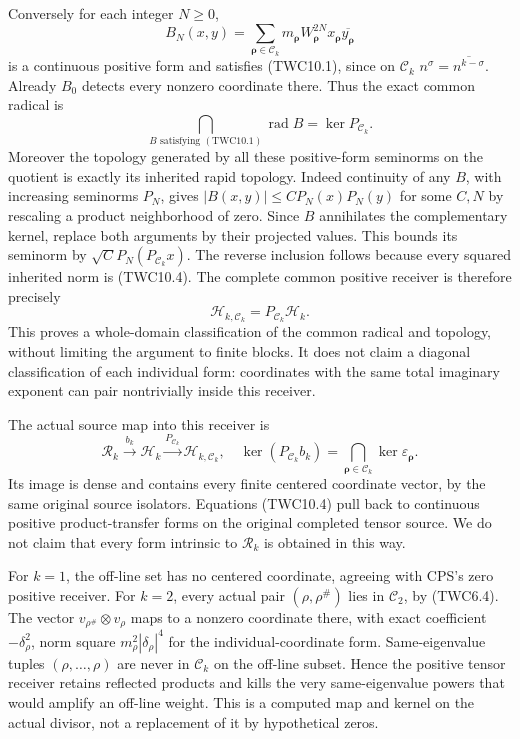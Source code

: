 Conversely for each integer \(N\ge0\), \[
B_N(x,y)=\sum_{\boldsymbol\rho\in\mathscr C_k}
m_{\boldsymbol\rho}W_{\boldsymbol\rho}^{2N}
 x_{\boldsymbol\rho}\overline{y_{\boldsymbol\rho}}
\tag{TWC10.4}
\] is a continuous positive form and satisfies (TWC10.1), since on
\(\mathscr C_k\) \(n^{\sigma}=\overline{n^{k-\sigma}}\). Already \(B_0\)
detects every nonzero coordinate there. Thus the exact common radical is
\[
\boxed{\quad\bigcap_{B\text{ satisfying }\mathrm{(TWC10.1)}}\operatorname{rad}B
=\ker P_{\mathscr C_k}.\quad}
\tag{TWC10.5}
\] Moreover the topology generated by all these positive-form seminorms
on the quotient is exactly its inherited rapid topology. Indeed
continuity of any \(B\), with increasing seminorms \(P_N\), gives
\(|B(x,y)|\le C P_N(x)P_N(y)\) for some \(C,N\) by rescaling a product
neighborhood of zero. Since \(B\) annihilates the complementary kernel,
replace both arguments by their projected values. This bounds its
seminorm by \(\sqrt C P_N(P_{\mathscr C_k}x)\). The reverse inclusion
follows because every squared inherited norm is (TWC10.4). The complete
common positive receiver is therefore precisely \[
\mathscr H_{k,\mathscr C_k}=P_{\mathscr C_k}\mathscr H_k.
\tag{TWC10.6}
\] This proves a whole-domain classification of the common radical and
topology, without limiting the argument to finite blocks. It does not
claim a diagonal classification of each individual form: coordinates
with the same total imaginary exponent can pair nontrivially inside this
receiver.

The actual source map into this receiver is \[
\mathscr R_k\xrightarrow{b_k}\mathscr H_k
\xrightarrow{P_{\mathscr C_k}}\mathscr H_{k,\mathscr C_k},
\quad
\ker(P_{\mathscr C_k}b_k)=\bigcap_{\boldsymbol\rho\in\mathscr C_k}
\ker\varepsilon_{\boldsymbol\rho}.
\tag{TWC10.7}
\] Its image is dense and contains every finite centered coordinate
vector, by the same original source isolators. Equations (TWC10.4) pull
back to continuous positive product-transfer forms on the original
completed tensor source. We do not claim that every form intrinsic to
\(\mathscr R_k\) is obtained in this way.

For \(k=1\), the off-line set has no centered coordinate, agreeing with
CPS's zero positive receiver. For \(k=2\), every actual pair
\((\rho,\rho^\#)\) lies in \(\mathscr C_2\), by (TWC6.4). The vector
\(v_{\rho^\#}\otimes v_\rho\) maps to a nonzero coordinate there, with
exact coefficient \(-\delta_\rho^2\), norm square
\(m_\rho^2|\delta_\rho|^4\) for the individual-coordinate form.
Same-eigenvalue tuples \((\rho,\ldots,\rho)\) are never in
\(\mathscr C_k\) on the off-line subset. Hence the positive tensor
receiver retains reflected products and kills the very same-eigenvalue
powers that would amplify an off-line weight. This is a computed map and
kernel on the actual divisor, not a replacement of it by hypothetical
zeros.

